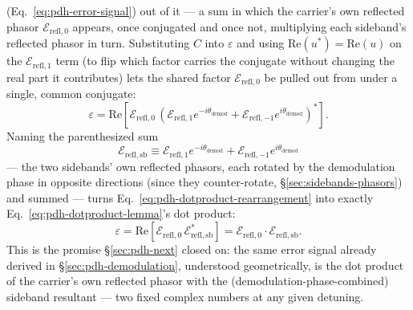 \documentclass[9pt]{article}
\begin{document}
(Eq.~\eqref{eq:pdh-error-signal}) out of it --- a sum in which the
carrier's own reflected phasor $\mathcal{E}_{\mathrm{refl},0}$ appears,
once conjugated and once not, multiplying each sideband's reflected
phasor in turn. Substituting $C$ into $\varepsilon$ and using
$\mathrm{Re}(u^*)=\mathrm{Re}(u)$ on the $\mathcal{E}_{\mathrm{refl},1}$
term (to flip which factor carries the conjugate without changing the real
part it contributes) lets the shared factor $\mathcal{E}_{\mathrm{refl},0}$
be pulled out from under a single, common conjugate:
\begin{equation}
\varepsilon = \mathrm{Re}\!\left[\mathcal{E}_{\mathrm{refl},0}\,\left(\mathcal{E}_{\mathrm{refl},1}e^{-i\theta_{\mathrm{demod}}} + \mathcal{E}_{\mathrm{refl},-1}e^{i\theta_{\mathrm{demod}}}\right)^*\right].
\label{eq:pdh-dotproduct-rearrangement}
\end{equation}
Naming the parenthesized sum
\begin{equation}
\mathcal{E}_{\mathrm{refl,sb}} \equiv \mathcal{E}_{\mathrm{refl},1}e^{-i\theta_{\mathrm{demod}}} + \mathcal{E}_{\mathrm{refl},-1}e^{i\theta_{\mathrm{demod}}}
\label{eq:pdh-dotproduct-sideband-resultant}
\end{equation}
--- the two sidebands' own reflected phasors, each rotated by the
demodulation phase in opposite directions (since they counter-rotate,
\S\ref{sec:sidebands-phasors}) and summed --- turns
Eq.~\eqref{eq:pdh-dotproduct-rearrangement} into exactly
Eq.~\eqref{eq:pdh-dotproduct-lemma}'s dot product:
\begin{equation}
\varepsilon = \mathrm{Re}\!\left[\mathcal{E}_{\mathrm{refl},0}\,\mathcal{E}_{\mathrm{refl,sb}}^*\right] = \mathcal{E}_{\mathrm{refl},0}\cdot\mathcal{E}_{\mathrm{refl,sb}}.
\label{eq:pdh-dotproduct-identity}
\end{equation}
This is the promise \S\ref{sec:pdh-next} closed on: the same error signal
already derived in \S\ref{sec:pdh-demodulation}, understood geometrically,
is the dot product of the carrier's own reflected phasor with the
(demodulation-phase-combined) sideband resultant --- two fixed complex
numbers at any given detuning.
\end{document}
